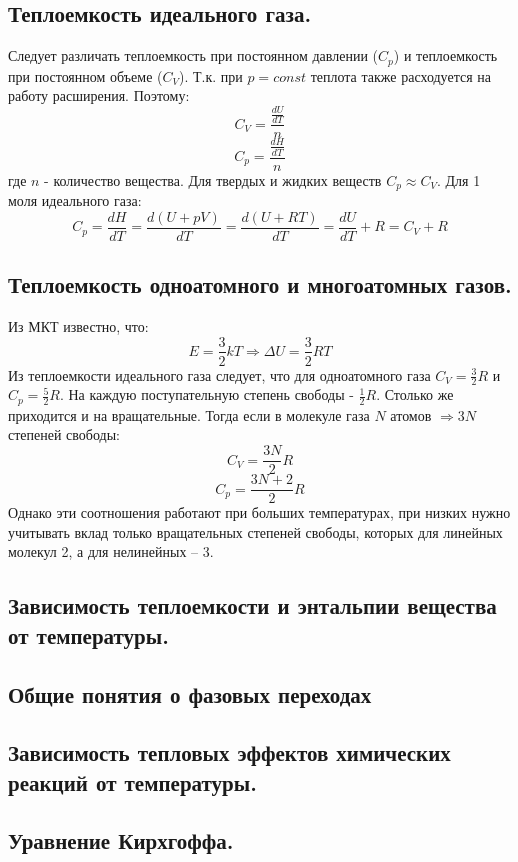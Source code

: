 \documentclass[14pt,a4paper]{scrartcl}
\begin{document}
\subsection*{Теплоемкость идеального газа.} 
Следует различать теплоемкость при постоянном давлении ($C_p$) и теплоемкость при постоянном объеме ($C_V$). Т.к. при $p=const$ теплота также расходуется на работу расширения. Поэтому:
$$C_V = \dfrac{\frac{dU}{dT}}{n} $$
$$C_p = \dfrac{\frac{dH}{dT}}{n} $$
где $n$ - количество вещества. Для твердых и жидких веществ $C_p \approx C_V$. Для 1 моля идеального газа:
$$C_p = \dfrac{dH}{dT} = \dfrac{d(U+pV)}{dT} = \dfrac{d(U+RT)}{dT} = \dfrac{dU}{dT} + R = C_V + R $$
\subsection*{Теплоемкость одноатомного и многоатомных газов.} 
Из МКТ известно, что:
$$E = \dfrac{3}{2} kT \Rightarrow \Delta{U} = \dfrac{3}{2} RT $$
Из теплоемкости идеального газа следует, что для одноатомного газа $C_V = \frac{3}{2} R $ и $C_p = \frac{5}{2}R$. На каждую поступательную степень свободы - $\frac{1}{2} R$. Столько же приходится и на вращательные. Тогда если в молекуле газа $N$ атомов $\Rightarrow 3N$ степеней свободы:
$$ C_V = \dfrac{3N}{2} R $$
$$ C_p = \dfrac{3N+2}{2} R $$
Однако эти соотношения работают при больших температурах, при низких нужно учитывать вклад только вращательных степеней свободы, которых для линейных молекул 2, а для нелинейных -- 3.
\subsection*{Зависимость теплоемкости и энтальпии вещества от температуры.} 
\subsection*{Общие понятия о фазовых переходах} 		
\subsection*{Зависимость тепловых эффектов химических реакций от температуры.} 		
\subsection*{Уравнение Кирхгоффа.} 	
\end{document}
